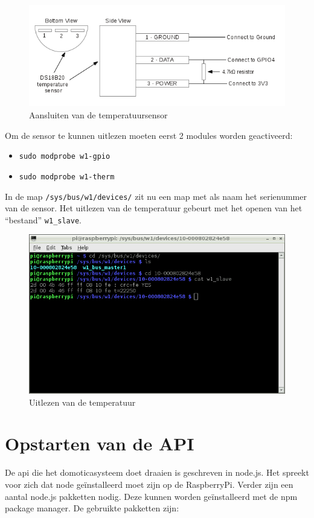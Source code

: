 \documentclass[a4paper,12pt]{article}
\begin{document}
\begin{figure}[ht!]
  \centering
    \includegraphics[scale=0.75]{sensor-connection.png}
   \caption*{Aansluiten van de temperatuursensor}
\end{figure}
\noindent
Om de sensor te kunnen uitlezen moeten eerst 2 modules worden geactiveerd: 
\begin{itemize}
\item \texttt{sudo modprobe w1-gpio}
\item \texttt{sudo modprobe w1-therm}
\end{itemize}
\noindent
In de map \texttt{/sys/bus/w1/devices/} zit nu een map met als naam het serienummer van de sensor. Het uitlezen van de temperatuur gebeurt met het openen van het ``bestand'' \texttt{w1\_slave}.
\begin{figure}[ht!]
  \centering
    \includegraphics[scale=0.50]{bash-temp-sensor.png}
   \caption*{Uitlezen van de temperatuur}
\end{figure}

\section{Opstarten van de API}
\noindent
De api die het domoticasysteem doet draaien is geschreven in node.js. Het spreekt voor zich dat node ge\"installeerd moet zijn op de RaspberryPi. Verder zijn een aantal node.js pakketten nodig. Deze kunnen worden ge\"installeerd met de npm package manager.
De gebruikte pakketten zijn:
\end{document}
